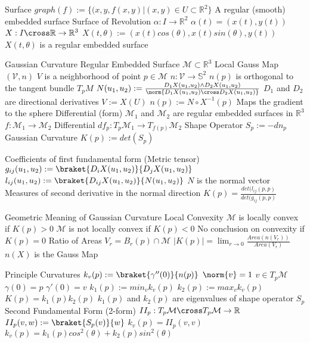 \documentclass[14pt]{extarticle}
\begin{document}
\begin{outline}
		\1	Surface
			\2	$graph(f) := \{(x,y,f(x,y) | (x,y) \in U \subset \mathbb{R}^2\}$
				\3	A regular (smooth) embedded surface
			\2	Surface of Revolution
				\3	$\alpha : I \rightarrow \mathbb{R}^2$
				\3	$\alpha(t) = (x(t),y(t))$
				\3	$X : I \cross \mathbb{R} \rightarrow \mathbb{R}^3$
				\3	$X(t,\theta) := (x(t)cos(\theta),x(t)sin(\theta),y(t))$
				\3	$X(t,\theta)$ is a regular embedded surface
	
	\1	Gaussian Curvature
		\2	Regular Embedded Surface $\mathcal{M} \subset \mathbb{R}^3$	
		\2	Local Gauss Map
			\3	$(\mathcal{V},n)$	
			\3	$V$ is a neighborhood of point $p \in \mathcal{M}$
			\3	$n : \mathcal{V} \rightarrow \mathbb{S}^2$
			\3	$n(p)$ is orthogonal to the tangent bundle $T_pM$
			\3	$N(u_1,u_2) := \frac{D_1X(u_1,u_2) \wedge D_2X(u_1,u_2)}{\norm{D_1X(u_1,u_2) \cross D_2X(u_1,u_2)}}$
				\4	$D_1$ and $D_2$ are directional derivatives
			\3	$V := X(U)$
			\3	$n(p) := N \circ X^{-1}(p)$
			\3	Maps the gradient to the sphere
		\2	Differential (form)
			\3	$\mathcal{M}_1$ and $\mathcal{M}_2$ are regular embedded surfaces in $\mathbb{R}^3$
			\3	$f : \mathcal{M}_1 \rightarrow \mathcal{M_2}$
			\3	Differential $df_p : T_p\mathcal{M}_1 \rightarrow T_{f(p)}\mathcal{M}_2$
		\2	Shape Operator
			\3	$S_p := -dn_p$
		\2	Gaussian Curvature 
			\3	$K(p) := det(S_p)$
	
	\1	Coefficients of first fundamental form (Metric tensor)
		\2	$g_{ij}(u_1,u_2) := \braket{D_iX(u_1,u_2)}{D_jX(u_1,u_2)}$
		\2	$l_{ij}(u_1,u_2) := \braket{D_{ij}X(u_1,u_2)}{N(u_1,u_2)}$
			\3	$N$ is the normal vector
			\3	Measures of second derivative in the normal direction
		\2	$K(p) = \frac{det(l_{ij}(p,p)}{det(g_{ij}(p,p)}$
	
	\1	Geometric Meaning of Gaussian Curvature
		\2	Local Convexity
			\3	$\mathcal{M}$ is locally convex if $K(p) > 0$
			\3	$\mathcal{M}$ is not locally convex if $K(p) < 0$
			\3	No conclusion on convexity if $K(p) = 0$
		\2	Ratio of Areas
			\3	$V_r = B_r(p) \cap \mathcal{M}$
			\3	$|K(p)| = \lim_{r\rightarrow 0} \frac{Area(n(V_r))}{Area(V_r)}$
			\3	$n(X)$ is the Gauss Map
	
	\1	Principle Curvatures
		\2	$k_v(p) := \braket{\gamma''(0)}{n(p)}$
			\3	$\norm{v} = 1$
			\3	$v \in T_p\mathcal{M}$
			\3	$\gamma(0) = p$
			\3	$\gamma'(0) = v$
		\2	$k_1(p) := min_v k_v(p)$
		\2	$k_2(p) := max_v k_v(p)$
		\2	$K(p) = k_1(p)k_2(p)$
			\3	$k_1(p)$ and $k_2(p)$ are eigenvalues of shape operator $S_p$
		\2	Second Fundamental Form (2-form)
			\3	$II_p : T_p\mathcal{M} \cross T_p\mathcal{M} \rightarrow \mathbb{R}$
			\3	$II_p(v,w) := \braket{S_p(v)}{w}$
			\3	$k_v(p) = II_p(v,v)$
			\3	$k_v(p) = k_1(p)cos^2(\theta) + k_2(p)sin^2(\theta)$
	

\end{outline}
\end{document}
